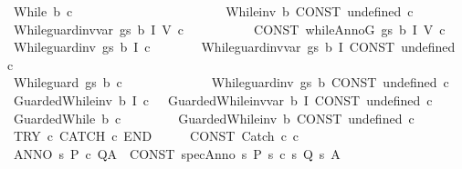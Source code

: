 \begin{isabellebody}
\ \ {\isachardoublequoteopen}{\isacharunderscore}While\ b\ c{\isachardoublequoteclose}\ \ \ \ \ \ \ \ \ \ \ \ \ \ \ \ \ \ \ \ \ \ \ {\isacharequal}{\isacharequal}\ {\isachardoublequoteopen}{\isacharunderscore}While{\isacharunderscore}inv\ b\ {\isacharbraceleft}{\isacharbar}CONST\ undefined{\isacharbar}{\isacharbraceright}\ c{\isachardoublequoteclose}\isanewline
\isanewline
\ \ {\isachardoublequoteopen}{\isacharunderscore}While{\isacharunderscore}guard{\isacharunderscore}inv{\isacharunderscore}var\ gs\ b\ I\ V\ c{\isachardoublequoteclose}\ \ \ \ \ \ \ \ \ \ {\isacharequal}{\isachargreater}\ {\isachardoublequoteopen}CONST\ whileAnnoG\ gs\ {\isacharbraceleft}{\isacharbar}b{\isacharbar}{\isacharbraceright}\ I\ V\ c{\isachardoublequoteclose}\isanewline
\isanewline
\ \ {\isachardoublequoteopen}{\isacharunderscore}While{\isacharunderscore}guard{\isacharunderscore}inv\ gs\ b\ I\ c{\isachardoublequoteclose}\ \ \ \ \ \ \ {\isacharequal}{\isacharequal}\ {\isachardoublequoteopen}{\isacharunderscore}While{\isacharunderscore}guard{\isacharunderscore}inv{\isacharunderscore}var\ gs\ b\ I\ {\isacharparenleft}CONST\ undefined{\isacharparenright}\ c{\isachardoublequoteclose}\isanewline
\ \ {\isachardoublequoteopen}{\isacharunderscore}While{\isacharunderscore}guard\ gs\ b\ c{\isachardoublequoteclose}\ \ \ \ \ \ \ \ \ \ \ \ \ {\isacharequal}{\isacharequal}\ {\isachardoublequoteopen}{\isacharunderscore}While{\isacharunderscore}guard{\isacharunderscore}inv\ gs\ b\ {\isacharbraceleft}{\isacharbar}CONST\ undefined{\isacharbar}{\isacharbraceright}\ c{\isachardoublequoteclose}\isanewline
\isanewline
\ \ {\isachardoublequoteopen}{\isacharunderscore}GuardedWhile{\isacharunderscore}inv\ b\ I\ c{\isachardoublequoteclose}\ \ {\isacharequal}{\isacharequal}\ {\isachardoublequoteopen}{\isacharunderscore}GuardedWhile{\isacharunderscore}inv{\isacharunderscore}var\ b\ I\ {\isacharparenleft}CONST\ undefined{\isacharparenright}\ c{\isachardoublequoteclose}\isanewline
\ \ {\isachardoublequoteopen}{\isacharunderscore}GuardedWhile\ b\ c{\isachardoublequoteclose}\ \ \ \ \ \ \ \ {\isacharequal}{\isacharequal}\ {\isachardoublequoteopen}{\isacharunderscore}GuardedWhile{\isacharunderscore}inv\ b\ {\isacharbraceleft}{\isacharbar}CONST\ undefined{\isacharbar}{\isacharbraceright}\ c{\isachardoublequoteclose}\isanewline
\isanewline
\ \ {\isachardoublequoteopen}TRY\ c{}\ CATCH\ c{}\ END{\isachardoublequoteclose}\ \ \ \ \ {\isacharequal}{\isacharequal}\ {\isachardoublequoteopen}CONST\ Catch\ c{}\ c{}{\isachardoublequoteclose}\isanewline
\ \ {\isachardoublequoteopen}ANNO\ s{\isachardot}\ P\ c\ Q{\isacharcomma}A{\isachardoublequoteclose}\ {\isacharequal}{\isachargreater}\ {\isachardoublequoteopen}CONST\ specAnno\ {\isacharparenleft}{\isasymlambda}s{\isachardot}\ P{\isacharparenright}\ {\isacharparenleft}{\isasymlambda}s{\isachardot}\ c{\isacharparenright}\ {\isacharparenleft}{\isasymlambda}s{\isachardot}\ Q{\isacharparenright}\ {\isacharparenleft}{\isasymlambda}s{\isachardot}\ A{\isacharparenright}{\isachardoublequoteclose}\isanewline

\end{isabellebody}
